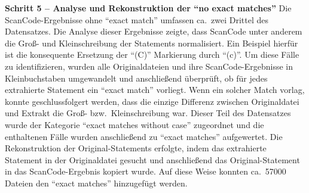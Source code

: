 \textbf{Schritt 5 -- Analyse und Rekonstruktion der \enquote{no exact matches}}
Die ScanCode-Ergebnisse ohne \enquote{exact match} umfassen ca.\ zwei Drittel des Datensatzes.
Die Analyse dieser Ergebnisse zeigte, dass ScanCode unter anderem die Groß- und Kleinschreibung der Statements normalisiert.
Ein Beispiel hierfür ist die konsequente Ersetzung der \enquote{(C)} Markierung durch \enquote{(c)}.
Um diese Fälle zu identifizieren, wurden alle Originaldateien und ihre ScanCode-Ergebnisse in Kleinbuchstaben umgewandelt und anschließend überprüft, ob für jedes extrahierte Statement ein \enquote{exact match} vorliegt.
Wenn ein solcher Match vorlag, konnte geschlussfolgert werden, dass die einzige Differenz zwischen Originaldatei und Extrakt die Groß- bzw.\ Kleinschreibung war.
Dieser Teil des Datensatzes wurde der Kategorie \enquote{exact matches without case} zugeordnet und die enthaltenen Fälle wurden anschließend zu \enquote{exact matches} aufgewertet.
Die Rekonstruktion der Original-Statements erfolgte, indem das extrahierte Statement in der Originaldatei gesucht und anschließend das Original-Statement in das ScanCode-Ergebnis kopiert wurde.
Auf diese Weise konnten ca.\ \num{57000} Dateien den \enquote{exact matches} hinzugefügt werden.

